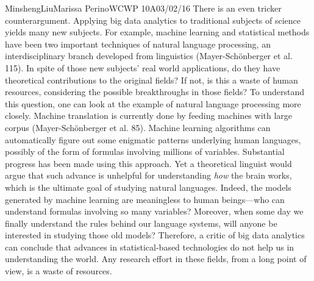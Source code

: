 \documentclass[12pt,letterpaper]{article}
\begin{document}
\begin{mla}{Minsheng}{Liu}{Marissa Perino}{WCWP 10A}{03/02/16}
There is an even tricker counterargument. Applying big data analytics to
traditional subjects of science yields many new subjects. For example,
machine learning and statistical methods have been two important
techniques of natural language processing, an interdisciplinary branch
developed from linguistics (Mayer-Schönberger et al. 115). In spite of
those new subjects' real world applications, do they have theoretical
contributions to the original fields? If not, is this a waste of human
resources, considering the possible breakthroughs in those fields? To
understand this question, one can look at the example of natural
language processing more closely. Machine translation is currently done
by feeding machines with large corpus (Mayer-Schönberger et al. 85).
Machine learning algorithms can automatically figure out some enigmatic
patterns underlying human languages, possibly of the form of formulas
involving millions of variables. Substantial progress has been made
using this approach. Yet a theoretical linguist would argue that such
advance is unhelpful for understanding \emph{how} the brain works, which
is the ultimate goal of studying natural languages. Indeed, the models
generated by machine learning are meaningless to human beings---who can
understand formulas involving so many variables? Moreover, when some day
we finally understand the rules behind our language systems, will anyone
be interested in studying those old models? Therefore, a critic of big
data analytics can conclude that advances in statistical-based
technologies do not help us in understanding the world. Any research
effort in these fields, from a long point of view, is a waste of
resources.


\end{mla}
\end{document}

